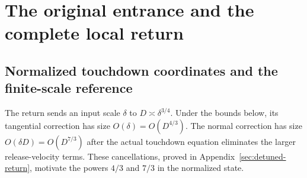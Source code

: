 \section{The original entrance and the complete local return}
\label{sec:local-results}




\subsection{Normalized touchdown coordinates and the finite-scale reference}

The return sends an input scale $\delta$ to
$D\asymp\delta^{3/4}$. Under the bounds below, its tangential
correction has size $O(\delta)=O(D^{4/3})$. The normal correction
has size $O(\delta D)=O(D^{7/3})$ after the actual touchdown equation
eliminates the larger release-velocity terms. These cancellations,
proved in Appendix~\ref{sec:detuned-return}, motivate the powers
$4/3$ and $7/3$ in the normalized state.

